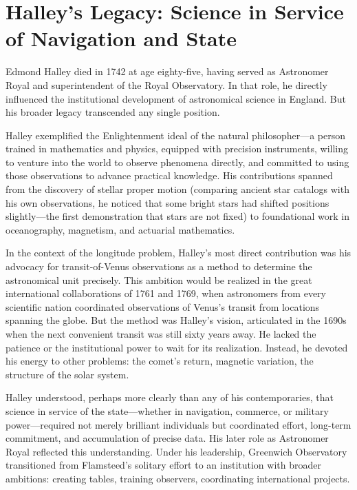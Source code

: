 \section{Halley's Legacy: Science in Service of Navigation and State}

Edmond Halley died in 1742 at age eighty-five, having served as Astronomer Royal and superintendent of the Royal Observatory. In that role, he directly influenced the institutional development of astronomical science in England. But his broader legacy transcended any single position.

Halley exemplified the Enlightenment ideal of the natural philosopher—a person trained in mathematics and physics, equipped with precision instruments, willing to venture into the world to observe phenomena directly, and committed to using those observations to advance practical knowledge. His contributions spanned from the discovery of stellar proper motion (comparing ancient star catalogs with his own observations, he noticed that some bright stars had shifted positions slightly—the first demonstration that stars are not fixed) to foundational work in oceanography, magnetism, and actuarial mathematics.

In the context of the longitude problem, Halley's most direct contribution was his advocacy for transit-of-Venus observations as a method to determine the astronomical unit precisely. This ambition would be realized in the great international collaborations of 1761 and 1769, when astronomers from every scientific nation coordinated observations of Venus's transit from locations spanning the globe. But the method was Halley's vision, articulated in the 1690s when the next convenient transit was still sixty years away. He lacked the patience or the institutional power to wait for its realization. Instead, he devoted his energy to other problems: the comet's return, magnetic variation, the structure of the solar system.

Halley understood, perhaps more clearly than any of his contemporaries, that science in service of the state—whether in navigation, commerce, or military power—required not merely brilliant individuals but coordinated effort, long-term commitment, and accumulation of precise data. His later role as Astronomer Royal reflected this understanding. Under his leadership, Greenwich Observatory transitioned from Flamsteed's solitary effort to an institution with broader ambitions: creating tables, training observers, coordinating international projects.

